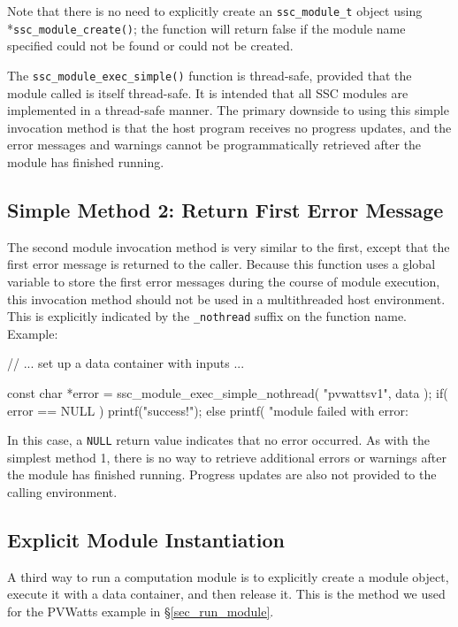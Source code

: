\documentclass{scrartcl} %
\newcommand{\+}{\discretionary{\mbox{\scriptsize$\hookleftarrow$}}{}{}}
\begin{document}
Note that there is no need to explicitly create an \texttt{ssc\_module\_t} object using \\*\texttt{ssc\_module\_create()}; the function will return false if the module name specified could not be found or could not be created.

The \texttt{ssc\_module\_exec\_simple()} function is thread-safe, provided that the module called is itself thread-safe.  It is intended that all SSC modules are implemented in a thread-safe manner.  The primary downside to using this simple invocation method is that the host program receives no progress updates, and the error messages and warnings cannot be programmatically retrieved after the module has finished running.

\subsection{Simple Method 2: Return First Error Message}
The second module invocation method is very similar to the first, except that the first error message is returned to the caller.  Because this function uses a global variable to store the first error messages during the course of module execution, this invocation method should not be used in a multithreaded host environment.  This is explicitly indicated by the \texttt{\_nothread} suffix on the function name.  Example:

\begin{verbatimtab}[4]
// ... set up a data container with inputs ...

const char *error = ssc_module_exec_simple_nothread( "pvwattsv1", data );
if( error == NULL )
	printf("success!\n");
else
	printf( "module failed with error: %
\end{verbatimtab}

In this case, a \texttt{NULL} return value indicates that no error occurred.  As with the simplest method 1, there is no way to retrieve additional errors or warnings after the module has finished running.  Progress updates are also not provided to the calling environment.

\subsection{Explicit Module Instantiation}
\label{sec_explicit_modules}

A third way to run a computation module is to explicitly create a module object, execute it with a data container, and then release it.  This is the method we used for the PVWatts example in \S\ref{sec_run_module}.
\end{document}
